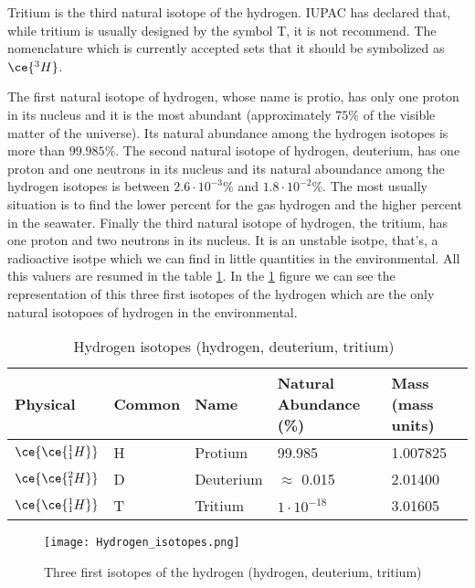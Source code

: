 Tritium is the third natural isotope of the hydrogen. IUPAC has declared that, while tritium is usually designed by the symbol T, it is not recommend. The nomenclature which is currently accepted sets that it should be symbolized as $\ce{^{3}H}$. 

The first natural isotope of hydrogen, whose name is protio, has only one proton in its nucleus and it is the most abundant (approximately $75\%$ of the visible matter of the universe). Its natural abundance among the hydrogen isotopes is more than $99.985\%$. The second natural isotope of hydrogen, deuterium, has one proton and one neutrons in its nucleus and its natural aboundance among the hydrogen isotopes is between $2.6 \cdotp 10^{-3}\%$ and $1.8 \cdotp 10^{-2}\%$. The most usually situation is to find the lower percent for the gas hydrogen and the higher percent in the seawater. Finally the third natural isotope of hydrogen, the tritium, has one proton and two neutrons in its nucleus. It is an unstable isotpe, that's, a radioactive isotpe which we can find in little quantities in the environmental. All this valuers are resumed in the table \ref{PropHIsot}. In the \ref{fig:HydrogenIsotopes} figure we can see the representation of this three first isotopes of the hydrogen which are the only natural isotopoes of hydrogen in the environmental.

\begin{table}[htbp]
\begin{center}
\begin{tabular}{|l|l|l|l|l|}
\hline
Physical & Common & Name & Natural Abundance (\%) & Mass (mass units) \\
\hline \hline \hline
$\ce{\ce{^{1}_{1}H}}$ & H & Protium & 99.985 & 1.007825 \\ \hline
$\ce{\ce{^{2}_{1}H}}$ & D & Deuterium & $\approx$ 0.015 & 2.01400 \\ \hline
$\ce{\ce{^{1}_{1}H}}$ & T & Tritium & $1 \cdot 10^{-18}$ & 3.01605\\ \hline
\end{tabular}
\caption{Hydrogen isotopes (hydrogen, deuterium, tritium)~\cite{documento manipulación segura tritio}}
\label{PropHIsot}
\end{center}
\end{table}

\begin{figure}[hbtp]
\texttt{[image: Hydrogen\_isotopes.png]}
\centering
\caption{Three first isotopes of the hydrogen (hydrogen, deuterium, tritium)~\cite{dondesea}\label{fig:HydrogenIsotopes}}
\end{figure}

